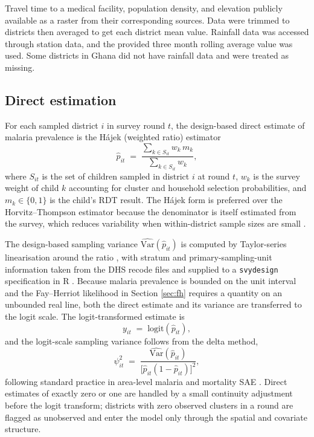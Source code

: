 \documentclass{article}
\begin{document}
Travel time to a medical facility, population density, and elevation
publicly available as a raster from their corresponding sources. Data
were trimmed to districts then averaged to get each district mean value.
Rainfall data was accessed through station data, and the provided three
month rolling average value was used. Some districts in Ghana did not
have rainfall data and were treated as missing.

\subsection{Direct estimation}\label{direct-estimation}

\label{sec:direct}

For each sampled district \(i\) in survey round \(t\), the design-based
direct estimate of malaria prevalence is the Hájek (weighted ratio)
estimator \begin{equation}
\hat{p}_{it} \;=\; \frac{\sum_{k \in S_{it}} w_k \, m_k}{\sum_{k \in S_{it}} w_k},
\label{eq:hajek}
\end{equation} where \(S_{it}\) is the set of children sampled in
district \(i\) at round \(t\), \(w_k\) is the survey weight of child
\(k\) accounting for cluster and household selection probabilities, and
\(m_k \in \{0, 1\}\) is the child's RDT result. The Hájek form is
preferred over the Horvitz--Thompson estimator because the denominator
is itself estimated from the survey, which reduces variability when
within-district sample sizes are small \citep{cochran1977, lumley2010}.

The design-based sampling variance
\(\widehat{\mathrm{Var}}(\hat{p}_{it})\) is computed by Taylor-series
linearisation around the ratio \citep{binder1983}, with stratum and
primary-sampling-unit information taken from the DHS recode files and
supplied to a \texttt{svydesign} specification in R \citep{lumley2004}.
Because malaria prevalence is bounded on the unit interval and the
Fay--Herriot likelihood in Section \ref{sec:fh} requires a quantity on
an unbounded real line, both the direct estimate and its variance are
transferred to the logit scale. The logit-transformed estimate is
\begin{equation}
y_{it} \;=\; \mathrm{logit}(\hat{p}_{it}),
\label{eq:logit}
\end{equation} and the logit-scale sampling variance follows from the
delta method, \begin{equation}
\psi_{it}^{2} \;=\; \frac{\widehat{\mathrm{Var}}(\hat{p}_{it})}{\bigl[\hat{p}_{it}(1 - \hat{p}_{it})\bigr]^{2}},
\label{eq:psi}
\end{equation} following standard practice in area-level malaria and
mortality SAE \citep{mercer2015, wakefield2020}. Direct estimates of
exactly zero or one are handled by a small continuity adjustment before
the logit transform; districts with zero observed clusters in a round
are flagged as unobserved and enter the model only through the spatial
and covariate structure.
\end{document}
